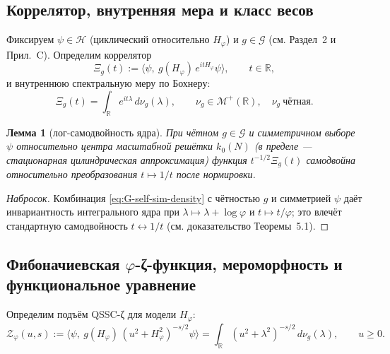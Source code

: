 \documentclass{article}
\numberwithin{equation}{section}
\theoremstyle{plain}
\newtheorem{lemma}{Лемма}
\theoremstyle{definition}
\theoremstyle{remark}
\def\leftrightarrow{↔}%
\begin{document}
\subsection*{Коррелятор, внутренняя мера и класс весов}

Фиксируем \( \psi\in\mathcal H \) (циклический относительно \(H_\varphi\)) и \( g\in\mathcal G \) (см. Раздел~2 и Прил.~\textup{C}). Определим коррелятор
\begin{equation}\label{eq:G-Xi}
\Xi_g(t):=\big\langle \psi,\ g(H_\varphi)\,e^{itH_\varphi}\psi\big\rangle,\qquad t\in\mathbb R,
\end{equation}
и внутреннюю спектральную меру по Бохнеру:
\begin{equation}\label{eq:G-nu}
\Xi_g(t)=\int_{\mathbb R} e^{it\lambda}\,d\nu_g(\lambda),\qquad 
\nu_g\in\mathcal M^+(\mathbb R),\quad \nu_g\ \text{чётная}.
\end{equation}

\begin{lemma}[лог-самодвойность ядра]\label{lem:G-selfdual-kernel}
При чётном \(g\in\mathcal G\) и симметричном выборе \(\psi\) относительно центра масштабной решётки \(k_0(N)\) (в пределе — стационарная цилиндрическая аппроксимация) функция \(t^{-1/2}\Xi_g(t)\) самодвойна относительно преобразования \(t\mapsto 1/t\) после нормировки.
\end{lemma}

\begin{proof}[Набросок]
Комбинация \eqref{eq:G-self-sim-density} с чётностью \(g\) и симметрией \(\psi\) даёт инвариантность интегрального ядра при \(\lambda\mapsto \lambda+\log\varphi\) и \(t\mapsto t/\varphi\); это влечёт стандартную самодвойность \(t\leftrightarrow 1/t\) (см. доказательство Теоремы~5.1).
\end{proof}

\subsection*{Фибоначиевская \texorpdfstring{$\varphi$}{φ}-ζ-функция, мероморфность и функциональное уравнение}

Определим подъём QSSC-ζ для модели \(H_\varphi\):
\begin{equation}\label{eq:G-Zeta}
\mathcal Z_\varphi(u,s):=\big\langle \psi,\ g(H_\varphi)\,(u^2+H_\varphi^2)^{-s/2}\psi\big\rangle
=\int_{\mathbb R}(u^2+\lambda^2)^{-s/2}\,d\nu_g(\lambda),\qquad u\ge 0.
\end{equation}
\end{document}
